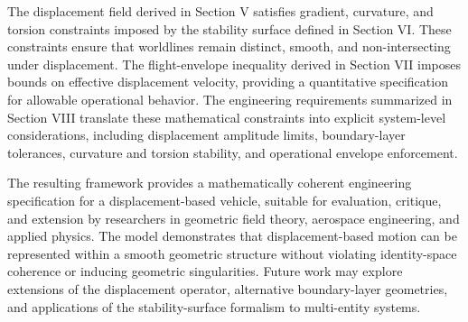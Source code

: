 \documentclass[aip,adv,reprint,floatfix]{revtex4-2}
\begin{document}
The displacement field derived in Section V satisfies gradient, curvature, and torsion constraints imposed by the stability surface defined in Section VI. These constraints ensure that worldlines remain distinct, smooth, and non-intersecting under displacement. The flight-envelope inequality derived in Section VII imposes bounds on effective displacement velocity, providing a quantitative specification for allowable operational behavior. The engineering requirements summarized in Section VIII translate these mathematical constraints into explicit system-level considerations, including displacement amplitude limits, boundary-layer tolerances, curvature and torsion stability, and operational envelope enforcement.

The resulting framework provides a mathematically coherent engineering specification for a displacement-based vehicle, suitable for evaluation, critique, and extension by researchers in geometric field theory, aerospace engineering, and applied physics. The model demonstrates that displacement-based motion can be represented within a smooth geometric structure without violating identity-space coherence or inducing geometric singularities. Future work may explore extensions of the displacement operator, alternative boundary-layer geometries, and applications of the stability-surface formalism to multi-entity systems.
\end{document}
